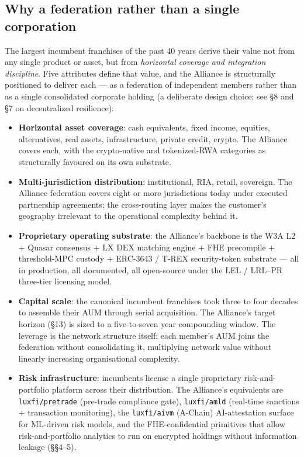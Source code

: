 \subsection{Why a federation rather than a single corporation}

The largest incumbent franchises of the past 40 years derive their value
not from any single product or asset, but from \emph{horizontal coverage
and integration discipline}. Five attributes define that value, and the
Alliance is structurally positioned to deliver each --- as a federation
of independent members rather than as a single consolidated corporate
holding (a deliberate design choice; see \S 8 and \S 7 on decentralized
resilience):

\begin{itemize}[leftmargin=2em,itemsep=0.1em]
\item \textbf{Horizontal asset coverage}: cash equivalents, fixed
income, equities, alternatives, real assets, infrastructure,
private credit, crypto. The Alliance covers each, with the
crypto-native and tokenized-RWA categories as structurally favoured
on its own substrate.
\item \textbf{Multi-jurisdiction distribution}: institutional, RIA,
retail, sovereign. The Alliance federation covers eight or more
jurisdictions today under executed partnership agreements; the
cross-routing layer makes the customer's geography irrelevant to the
operational complexity behind it.
\item \textbf{Proprietary operating substrate}: the Alliance's
backbone is the W3A L2 + Quasar consensus + LX DEX matching engine +
FHE precompile + threshold-MPC custody + ERC-3643 / T-REX
security-token substrate --- all in production, all documented, all
open-source under the LEL / LRL--PR three-tier licensing model.
\item \textbf{Capital scale}: the canonical incumbent franchises took
three to four decades to assemble their AUM through serial
acquisition. The Alliance's target horizon (\S 13) is sized to a
five-to-seven year compounding window. The leverage is the network
structure itself: each member's AUM joins the federation without
consolidating it, multiplying network value without linearly
increasing organisational complexity.
\item \textbf{Risk infrastructure}: incumbents license a single
proprietary risk-and-portfolio platform across their distribution.
The Alliance's equivalents are \texttt{luxfi/pretrade} (pre-trade
compliance gate), \texttt{luxfi/amld} (real-time sanctions +
transaction monitoring), the \texttt{luxfi/aivm} (A-Chain)
AI-attestation surface for ML-driven risk models, and the
FHE-confidential primitives that allow risk-and-portfolio analytics
to run on encrypted holdings without information leakage (\S\S 4--5).
\end{itemize}

